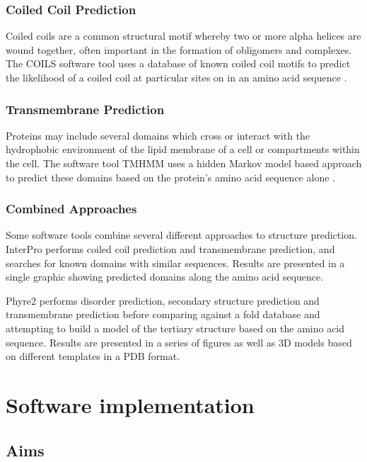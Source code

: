 \documentclass[fleqn,10pt]{article} %
\begin{document}
\subsubsection*{Coiled Coil Prediction}

Coiled coils are a common structural motif whereby two or more alpha helices are wound together, often important in the formation of obligomers and complexes. The COILS software tool uses a database of known coiled coil motifs to predict the likelihood of a coiled coil at particular sites on in an amino acid sequence \cite{Lupas1991}.

\subsubsection*{Transmembrane Prediction}

Proteins may include several domains which cross or interact with the hydrophobic environment of the lipid membrane of a cell or compartments within the cell. The software tool TMHMM uses a hidden Markov model based approach to predict these domains based on the protein's amino acid sequence alone \cite{Krogh2001}.

\subsubsection*{Combined Approaches}

Some software tools combine several different approaches to structure prediction. InterPro \cite{Mulder2002} performs coiled coil prediction and transmembrane prediction, and searches for known domains with similar sequences. Results are presented in a single graphic showing predicted domains along the amino acid sequence.

Phyre2 \cite{Kelley2009} performs disorder prediction, secondary structure prediction and transmembrane prediction before comparing against a fold database and attempting to build a model of the tertiary structure based on the amino acid sequence. Results are presented in a series of figures as well as 3D models based on different templates in a PDB format.

\section{Software implementation}
\subsection{Aims}
\end{document}
